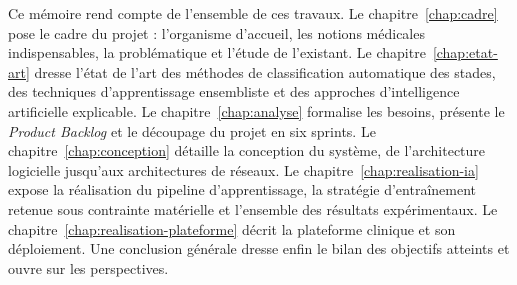 Ce mémoire rend compte de l'ensemble de ces travaux. Le
chapitre~\ref{chap:cadre} pose le cadre du projet : l'organisme d'accueil, les notions
médicales indispensables, la problématique et l'étude de l'existant. Le
chapitre~\ref{chap:etat-art} dresse l'état de l'art des méthodes de classification
automatique des stades, des techniques d'apprentissage ensembliste et des approches
d'intelligence artificielle explicable. Le chapitre~\ref{chap:analyse} formalise les
besoins, présente le \emph{Product Backlog} et le découpage du projet en six sprints.
Le chapitre~\ref{chap:conception} détaille la conception du système, de l'architecture
logicielle jusqu'aux architectures de réseaux. Le chapitre~\ref{chap:realisation-ia}
expose la réalisation du pipeline d'apprentissage, la stratégie d'entraînement retenue
sous contrainte matérielle et l'ensemble des résultats expérimentaux. Le
chapitre~\ref{chap:realisation-plateforme} décrit la plateforme clinique et son
déploiement. Une conclusion générale dresse enfin le bilan des objectifs atteints et
ouvre sur les perspectives.
